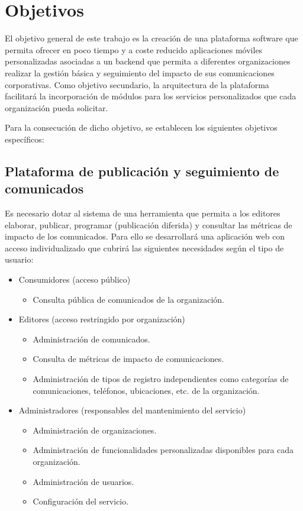 \chapter{Objetivos}
El objetivo general de este trabajo es la creación de una plataforma software que permita ofrecer en poco tiempo y a coste reducido aplicaciones móviles personalizadas asociadas a un backend que permita a diferentes organizaciones realizar la gestión básica y seguimiento del impacto de sus comunicaciones corporativas. Como objetivo secundario, la arquitectura de la plataforma facilitará la incorporación de módulos para los servicios personalizados que cada organización pueda solicitar.

Para la consecución de dicho objetivo, se establecen los siguientes objetivos específicos:

\section{Plataforma de publicación y seguimiento de comunicados}
Es necesario dotar al sistema de una herramienta que permita a los editores elaborar, publicar, programar (publicación diferida) y consultar las métricas de impacto de los comunicados. Para ello se desarrollará una aplicación web con acceso individualizado que cubrirá las siguientes necesidades según el tipo de usuario:
\begin{itemize}
    \item Consumidores (acceso público)
    \begin{itemize}
        \item Consulta pública de comunicados de la organización.
    \end{itemize}
    \item Editores (acceso restringido por organización)
    \begin{itemize}
        \item Administración de comunicados.
        \item Consulta de métricas de impacto de comunicaciones.
        \item Administración de tipos de registro independientes como categorías de comunicaciones, teléfonos, ubicaciones, etc. de la organización.
    \end{itemize}
    \item Administradores (responsables del mantenimiento del servicio)
    \begin{itemize}
        \item Administración de organizaciones.
        \item Administración de funcionalidades personalizadas disponibles para cada organización.
        \item Administración de usuarios.
        \item Configuración del servicio.
    \end{itemize}
\end{itemize}


